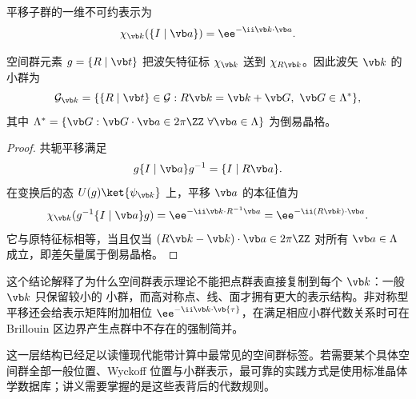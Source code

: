 平移子群的一维不可约表示为
\[
\chi_{\vb k}(\{I\mid\vb a\})=\ee^{-\ii\vb k\cdot\vb a}.
\]
\begin{proposition}[波矢轨道与小群]
空间群元素 $g=\{R\mid\vb t\}$ 把波矢特征标 $\chi_{\vb k}$ 送到 $\chi_{R\vb k}$。因此波矢 $\vb k$ 的小群为
\[
\mathcal G_{\vb k}=\{\{R\mid\vb t\}\in\mathcal G:
R\vb k=\vb k+\vb G,\ \vb G\in\Lambda^*\},
\]
其中 $\Lambda^*=\{\vb G:\vb G\cdot\vb a\in2\pi\ZZ\ \forall\vb a\in\Lambda\}$ 为倒易晶格。
\end{proposition}
\begin{proof}
共轭平移满足
\[
g\{I\mid\vb a\}g^{-1}=\{I\mid R\vb a\}.
\]
在变换后的态 $U(g)\ket{\psi_{\vb k}}$ 上，平移 $\vb a$ 的本征值为
\[
\chi_{\vb k}(g^{-1}\{I\mid\vb a\}g)
=\ee^{-\ii\vb k\cdot R^{-1}\vb a}
=\ee^{-\ii(R\vb k)\cdot\vb a}.
\]
它与原特征标相等，当且仅当 $(R\vb k-\vb k)\cdot\vb a\in2\pi\ZZ$ 对所有 $\vb a\in\Lambda$ 成立，即差矢量属于倒易晶格。
\end{proof}
这个结论解释了为什么空间群表示理论不能把点群表直接复制到每个 $\vb k$：一般 $\vb k$ 只保留较小的 小群，而高对称点、线、面才拥有更大的表示结构。非对称型平移还会给表示矩阵附加相位 $\ee^{-\ii\vb k\cdot\vb{\tau}}$，在满足相应小群代数关系时可在 Brillouin 区边界产生点群中不存在的强制简并。

这一层结构已经足以读懂现代能带计算中最常见的空间群标签。若需要某个具体空间群全部一般位置、Wyckoff 位置与小群表示，最可靠的实践方式是使用标准晶体学数据库；讲义需要掌握的是这些表背后的代数规则。
